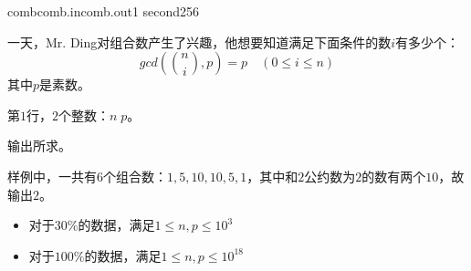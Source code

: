 \documentclass[11pt,a4paper,oneside]{article}
\begin{document}
\begin{problem}{comb}{comb.in}{comb.out}{1 second}{256}
	
	一天，Mr. Ding对组合数产生了兴趣，他想要知道满足下面条件的数$i$有多少个：
	$$
		gcd(\binom{n}{i},p) = p \quad ( 0 \leq i \leq n )
	$$
	其中$p$是素数。
	
	\InputFile
	
	第$1$行，$2$个整数：$n \; p$。
	
	\OutputFile
	
	输出所求。
	
	\Example
	
	\begin{example}
\end{example}

\Note
	样例中，一共有$6$个组合数：$1, 5, 10, 10, 5, 1$，其中和$2$公约数为$2$的数有两个$10$，故输出$2$。
	\begin{itemize}
		\item 对于$30\%$的数据，满足$ 1 \leq n, p \leq 10^3 $
		\item 对于$100\%$的数据，满足$ 1 \leq n, p \leq 10^{18} $
	\end{itemize}
\end{problem}
\end{document}
